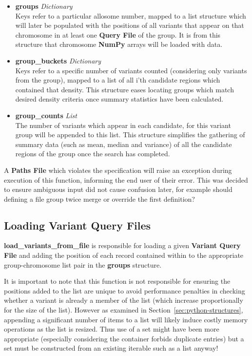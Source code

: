 \begin{itemize}
    \item \textbf{groups} \textit{Dictionary}\hfill\\
        Keys refer to a particular allosome number, mapped to a list structure
        which will later be populated with the positions of all variants that
        appear on that chromosome in at least one \textbf{Query File} of
        the group. It is from this structure that chromosome \textbf{NumPy}
        arrays will be loaded with data.
    \item \textbf{group\_buckets} \textit{Dictionary}\hfill\\
        Keys refer to a specific number of variants counted (considering only
        variants from the group), mapped to a list
        of all i'th candidate regions which contained that density.
        This structure eases locating groups which match desired density
        criteria once summary statistics have been calculated.
    \item \textbf{group\_counts} \textit{List}\hfill\\
        The number of variants which appear in each candidate, for this variant
        group will be appended to this list.  This structure simplifies the
        gathering of summary data (such as mean, median and variance) of all the
        candidate regions of the group once the search has completed.
\end{itemize}

A \textbf{Paths File} which violates the specification will raise an exception
during execution of this function, informing the end user of their error. This
was decided to ensure ambiguous input did not cause confusion later, for example
should defining a file group twice merge or override the first
definition?


\subsection{Loading Variant Query Files}
%
%

\textbf{load\_variants\_from\_file} is responsible for loading a given
\textbf{Variant Query File} and adding the position of each record contained
within to the appropriate group-chromosome list pair in the \textbf{groups}
structure.

It is important to note that this function is not responsible for
ensuring the positions added to the list are unique to avoid performance
penalties in checking whether a variant is already a member of the list (which
increase proportionally for the size of the list).
However as examined in Section~\ref{sec:python-structures}, appending a
significant number of items to a list will likely induce costly memory
operations as the list is resized. Thus use of a set might have been more
appropriate (especially considering the container forbids duplicate entries)
but a set must be constructed from an existing iterable such as a list anyway!

